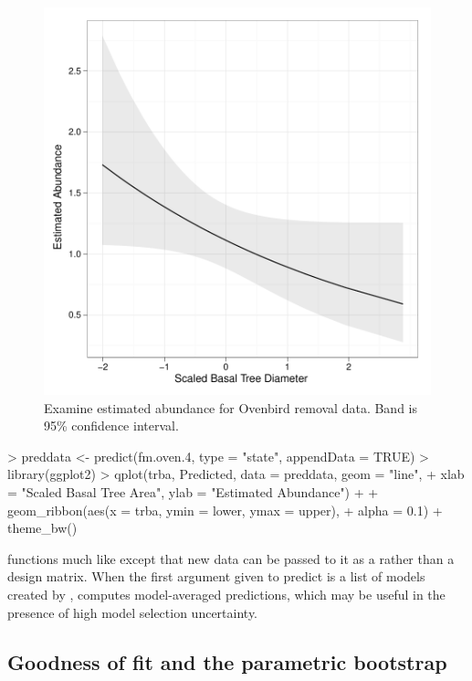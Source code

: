\documentclass[article,shortnames]{jss}
\begin{document}
{\begin{figure}[ht]
  \centering
\includegraphics{unmarked-029}
\caption{Examine estimated abundance for Ovenbird removal data.  Band
  is 95\% confidence interval.}
\label{fig:pred}
\end{figure}

\begin{Schunk}
\begin{Sinput}
> preddata <- predict(fm.oven.4, type = "state", appendData = TRUE)
> library(ggplot2)
> qplot(trba, Predicted, data = preddata, geom = "line", 
+     xlab = "Scaled Basal Tree Area", ylab = "Estimated Abundance") + 
+     geom_ribbon(aes(x = trba, ymin = lower, ymax = upper), 
+         alpha = 0.1) + theme_bw()
\end{Sinput}
\end{Schunk}



 functions much like  except that new data can be
passed to it as a  rather than a design matrix. When the first 
argument given to predict is a list of models created by , 
 computes model-averaged predictions, which may be
useful in the presence of high model selection uncertainty.  



\subsection{Goodness of fit and the parametric bootstrap}

}
\end{document}
